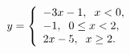 \begin{ex}
	\begin{condition}
		\(  y = 
		\left\{
		\begin{array}{l}
			-3x-1,\hspace{2mm}x<0, \\
			-1,\hspace{2mm}0\le x < 2, \\
			2x-5,\hspace{2mm} x \ge  2.
		\end{array}
		\right. \)
	\end{condition}
\end{ex}